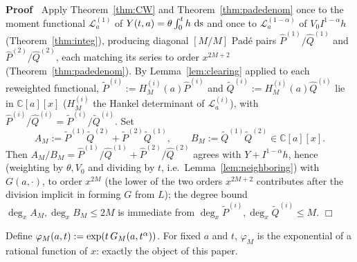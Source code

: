\documentclass{article}
\newcommand{\assign}{:=}
\newcommand{\tmop}[1]{\ensuremath{\operatorname{#1}}}
\newenvironment{proof}{\noindent\textbf{Proof\ }}{\hspace*{\fill}$\Box$\medskip}
\newcommand{\C}{\mathbb{C}}
\newcommand{\Lop}{\mathcal{L}}
\begin{document}
\begin{proof}
  Apply Theorem~\ref{thm:CW} and Theorem~\ref{thm:padedenom} once to the
  moment functional $\Lop_a^{(1)}$ of $Y (t, a) = \theta \int_0^t h
  \hspace{0.17em} \tmop{ds}$ and once to $\Lop_a^{(1 - \alpha)}$ of $V_0
  I^{1 - \alpha} h$ (Theorem~\ref{thm:integ}), producing diagonal $[M / M]$
  Pad{\'e} pairs $\hat{P}^{(1)} / \hat{Q}^{(1)}$ and $\hat{P}^{(2)} /
  \hat{Q}^{(2)}$, each matching its series to order $x^{2 M + 2}$
  (Theorem~\ref{thm:padedenom}). By Lemma~\ref{lem:clearing} applied to each
  reweighted functional, $\tilde{P}^{(i)} \assign H_M^{(i)} (a) \hat{P}^{(i)}$
  and $\tilde{Q}^{(i)} \assign H_M^{(i)} (a) \hat{Q}^{(i)}$ lie in $\C [a]
  [x]$ ($H_M^{(i)}$ the Hankel determinant of $\Lop_a^{(i)}$), with $\hat{P}^{(i)}
  / \hat{Q}^{(i)} = \tilde{P}^{(i)} / \tilde{Q}^{(i)}$. Set
  \[ A_M \assign \tilde{P}^{(1)}  \tilde{Q}^{(2)} + \tilde{P}^{(2)}
     \tilde{Q}^{(1)}, \qquad B_M \assign \tilde{Q}^{(1)}  \tilde{Q}^{(2)} \in
     \C [a] [x] . \]
  Then $A_M / B_M = \hat{P}^{(1)} / \hat{Q}^{(1)} + \hat{P}^{(2)} /
  \hat{Q}^{(2)}$ agrees with $Y + I^{1 - \alpha} h$, hence (weighting by
  $\theta, V_0$ and dividing by $t$, i.e.\ Lemma~\ref{lem:neighboring}) with
  $G (a, \cdot)$, to order $x^{2 M}$ (the lower of the two orders $x^{2 M +
  2}$ contributes after the division implicit in forming $G$ from $L$); the
  degree bound $\deg_x A_M, \deg_x B_M \le 2 M$ is immediate from $\deg_x
  \tilde{P}^{(i)}, \deg_x \tilde{Q}^{(i)} \le M$.
\end{proof}

Define $\varphi_M (a, t) \assign \exp (t \hspace{0.17em} G_M (a, t^{\alpha}))$.
For fixed $a$ and $t$, $\varphi_M$ is the exponential of a rational function
of $x$: exactly the object of this paper.
\end{document}

